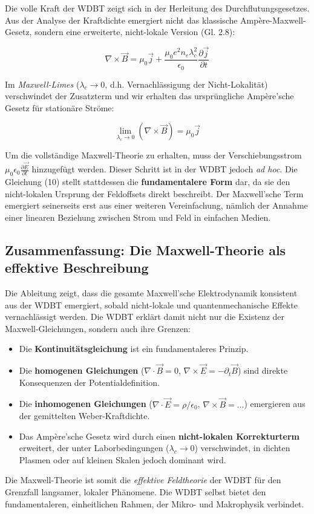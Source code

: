 Die volle Kraft der WDBT zeigt sich in der Herleitung des Durchflutungsgesetzes. Aus der Analyse der Kraftdichte emergiert nicht das klassische Ampère-Maxwell-Gesetz, sondern eine erweiterte, nicht-lokale Version (Gl. 2.8):

\begin{equation}
    \nabla \times \vec{B} = \mu_0 \vec{j} + \frac{\mu_0 e^2 n_e \lambda_c^2}{\epsilon_0} \frac{\partial \vec{j}}{\partial t}
\end{equation}

Im \textit{Maxwell-Limes} ($\lambda_c \rightarrow 0$, d.h. Vernachlässigung der Nicht-Lokalität) verschwindet der Zusatzterm und wir erhalten das ursprüngliche Ampère'sche Gesetz für stationäre Ströme:

\begin{equation}
    \lim_{\lambda_c \to 0} \left( \nabla \times \vec{B} \right) = \mu_0 \vec{j}
\end{equation}

Um die vollständige Maxwell-Theorie zu erhalten, muss der Verschiebungsstrom $\mu_0 \epsilon_0 \frac{\partial \vec{E}}{\partial t}$ hinzugefügt werden. Dieser Schritt ist in der WDBT jedoch \textit{ad hoc}. Die Gleichung (10) stellt stattdessen die \textbf{fundamentalere Form} dar, da sie den nicht-lokalen Ursprung der Feldoffsets direkt beschreibt. Der Maxwell'sche Term emergiert seinerseits erst aus einer weiteren Vereinfachung, nämlich der Annahme einer linearen Beziehung zwischen Strom und Feld in einfachen Medien.

\subsection{Zusammenfassung: Die Maxwell-Theorie als effektive Beschreibung}

Die Ableitung zeigt, dass die gesamte Maxwell'sche Elektrodynamik konsistent aus der WDBT emergiert, sobald nicht-lokale und quantenmechanische Effekte vernachlässigt werden. Die WDBT erklärt damit nicht nur die Existenz der Maxwell-Gleichungen, sondern auch ihre Grenzen:

\begin{itemize}
    \item Die \textbf{Kontinuitätsgleichung} ist ein fundamentaleres Prinzip.
    \item Die \textbf{homogenen Gleichungen} ($\nabla \cdot \vec{B} = 0$, $\nabla \times \vec{E} = -\partial_t \vec{B}$) sind direkte Konsequenzen der Potentialdefinition.
    \item Die \textbf{inhomogenen Gleichungen} ($\nabla \cdot \vec{E} = \rho/\epsilon_0$, $\nabla \times \vec{B} = \ldots$) emergieren aus der gemittelten Weber-Kraftdichte.
    \item Das Ampère'sche Gesetz wird durch einen \textbf{nicht-lokalen Korrekturterm} erweitert, der unter Laborbedingungen ($\lambda_c \rightarrow 0$) verschwindet, in dichten Plasmen oder auf kleinen Skalen jedoch dominant wird.
\end{itemize}

Die Maxwell-Theorie ist somit die \textit{effektive Feldtheorie} der WDBT für den Grenzfall langsamer, lokaler Phänomene. Die WDBT selbst bietet den fundamentaleren, einheitlichen Rahmen, der Mikro- und Makrophysik verbindet.

